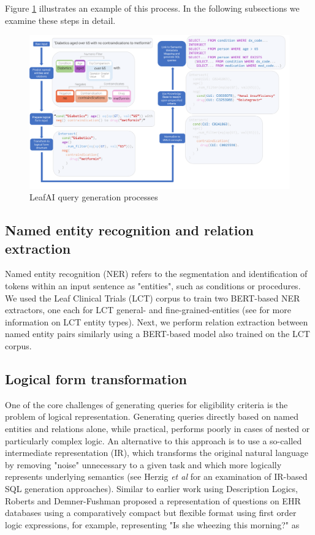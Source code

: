 \documentclass[../main.tex]{subfiles}
\begin{document}
\noindent Figure \ref{fig_leafai_querygen} illustrates an example of this process. In the following subsections we examine these steps in detail.

\begin{figure}[h]
  \includegraphics[scale=0.46]{Figures/7_query_generation/leafai_flow.pdf}  
\caption{LeafAI query generation processes}
\label{fig_leafai_querygen}
\end{figure}

\subsection{Named entity recognition and relation extraction}

\noindent Named entity recognition (NER) refers to the segmentation and identification of tokens within an input sentence as "entities", such as conditions or procedures. We used the Leaf Clinical Trials (LCT) corpus \cite{dobbins2022leaf} to train two BERT-based \cite{devlin2018bert} NER extractors, one each for LCT general- and fine-grained-entities (see \cite{dobbins2022leaf} for more information on LCT entity types). Next, we perform relation extraction between named entity pairs similarly using a BERT-based model also trained on the LCT corpus.

\subsection{Logical form transformation}

\noindent One of the core challenges of generating queries for eligibility criteria is the problem of logical representation. Generating queries directly based on named entities and relations alone, while practical, performs poorly in cases of nested or particularly complex logic. An alternative to this approach is to use a so-called intermediate representation (IR), which transforms the original natural language by removing "noise" unnecessary to a given task and which more logically represents underlying semantics (see Herzig \textit{et al} \cite{herzig2021unlocking} for an examination of IR-based SQL generation approaches). Similar to earlier work using Description Logics, Roberts and Demner-Fushman \cite{roberts2016annotating} proposed a representation of questions on EHR databases using a comparatively compact but flexible format using first order logic expressions, for example, representing "Is she wheezing this morning?" as
\end{document}
